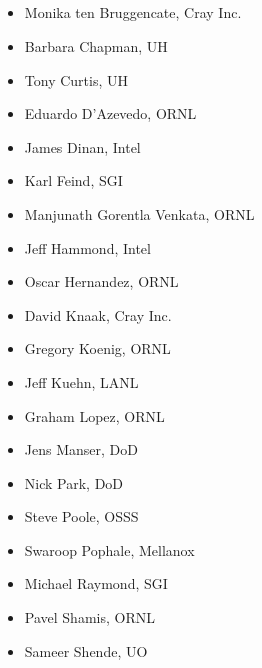 \subsection*{}
\begin{multicols}{2}
\begin{itemize}
\setlength\itemsep{0.1em}
\item Monika ten Bruggencate, Cray Inc.
\item Barbara Chapman, \ac{UH}
\item Tony Curtis, \ac{UH}
\item Eduardo D’Azevedo, \ac{ORNL}
\item James Dinan, Intel
\item Karl Feind, \ac{SGI}
\item Manjunath Gorentla Venkata, \ac{ORNL}
\item Jeff Hammond, Intel
\item Oscar Hernandez, \ac{ORNL}
\item David Knaak, Cray Inc.
\item Gregory Koenig, \ac{ORNL}
\item Jeff Kuehn, \ac{LANL}
\item Graham Lopez, \ac{ORNL}
\item Jens Manser, \ac{DoD}
\item Nick Park, \ac{DoD}
\item Steve Poole, \ac{OSSS}
\item Swaroop Pophale, Mellanox
\item Michael Raymond, \ac{SGI}
\item Pavel Shamis, \ac{ORNL}
\item Sameer Shende, \ac{UO}
\end{itemize}
\end{multicols}

